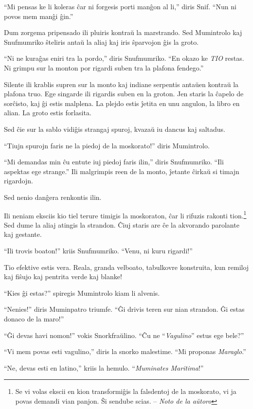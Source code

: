``Mi pensas ke li koleras ĉar ni forgesis porti manĝon al li,'' diris Snif. ``Nun ni povos mem manĝi ĝin.''

Dum zorgema pripensado ili pluiris kontraŭ la marstrando. Sed Mumintrolo kaj Snufmumriko ŝteliris antaŭ la aliaj kaj iris ŝparvojon ĝis la groto.

``Ni ne kuraĝas eniri tra la pordo,'' diris Snufmumriko. ``En okazo ke \emph{TIO} restas. Ni grimpu sur la monton por rigardi suben tra la plafona fendego.''

Silente ili krablis supren sur la monto kaj indiane serpentis antaŭen kontraŭ la plafona truo. Ege singarde ili rigardis suben en la groton. Jen staris la ĉapelo de sorĉisto, kaj ĝi estis malplena. La plejdo estis ĵetita en unu angulon, la libro en alian. La groto estis forlasita.

Sed ĉie sur la sablo vidiĝis strangaj spuroj, kvazaŭ iu dancus kaj saltadus.

``Tiujn spurojn faris ne la piedoj de la moskorato!'' diris Mumintrolo.

``Mi demandas min ĉu entute iuj piedoj faris ilin,'' diris Snufmumriko. ``Ili aspektas ege strange.'' Ili malgrimpis reen de la monto, ĵetante ĉirkaŭ si timajn rigardojn.

Sed nenio danĝera renkontis ilin.

Ili neniam eksciis kio tiel terure timigis la moskoraton, ĉar li rifuzis rakonti tion.\footnote{Se vi volas ekscii en kion transformiĝis la falsdentoj de la moskorato, vi ja povas demandi vian panjon. Ŝi sendube scias. -- \emph{Noto de la aŭtoro}}
\sectionbreak
Sed dume la aliaj atingis la strandon. Ĉiuj staris are ĉe la akvorando parolante kaj gestante.

``Ili trovis boaton!'' kriis Snufmumriko. ``Venu, ni kuru rigardi!''

Tio efektive estis vera. Reala, granda velboato, tabulkovre konstruita, kun remiloj kaj fiŝujo kaj pentrita verde kaj blanke!

``Kies ĝi estas?'' spiregis Mumintrolo kiam li alvenis.

``Nenies!'' diris Muminpatro triumfe. ``Ĝi drivis teren sur nian strandon. Ĝi estas donaco de la maro!''

``Ĝi devas havi nomon!'' vokis Snorkfraŭlino. ``Ĉu ne ``\emph{Vagulino}'' estus ege bele?''

``Vi mem povas esti vagulino,'' diris la snorko malestime. ``Mi proponas \emph{Maraglo}.''

``Ne, devas esti en latino,'' kriis la hemulo. ``\emph{Muminates Maritima}!''


